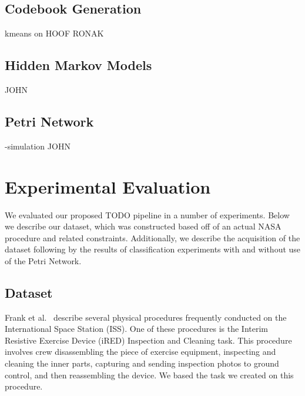 \documentclass[10pt,twocolumn,letterpaper]{article}
\begin{document}
\subsection{Codebook Generation}
kmeans on HOOF
RONAK

\subsection{Hidden Markov Models}
JOHN

\subsection{Petri Network}
-simulation
JOHN
\section{Experimental Evaluation}

We evaluated our proposed TODO pipeline in a number of experiments. Below we describe our dataset, which was constructed based off of an actual NASA procedure and related constraints. Additionally, we describe the acquisition of the dataset following by the results of classification experiments with and without use of the Petri Network.

\subsection{Dataset}

Frank et al.~\cite{frank2013autonomous} describe several physical procedures frequently conducted on the International Space Station (ISS). One of these procedures is the Interim Resistive Exercise Device (iRED) Inspection and Cleaning task. This procedure involves crew disassembling the piece of exercise equipment, inspecting and cleaning the inner parts, capturing and sending inspection photos to ground control, and then reassembling the device. We based the task we created on this procedure.
\end{document}
